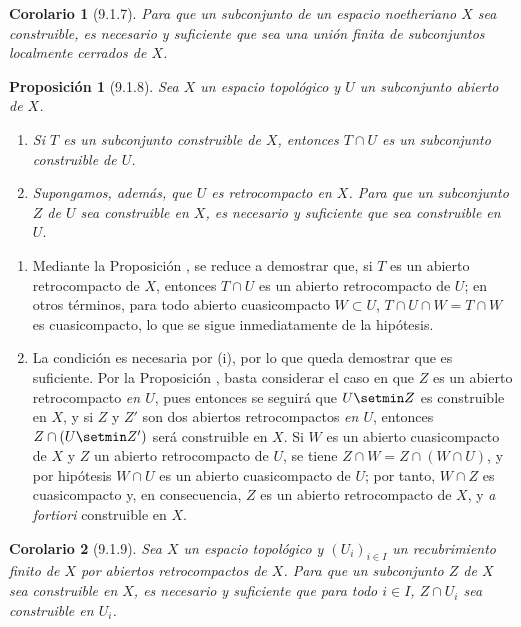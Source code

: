 \documentclass[10pt,oneside,openany]{book}
\theoremstyle{egaenv}\newtheorem*{env}{---}
\theoremstyle{egastatement}
\newtheorem*{proposition}{Proposición}
\newtheorem*{corollary}{Corolario}
\theoremstyle{egadescription}
\begin{document}
\begin{corollary}[9.1.7]
\label{0.9.1.7}
\label{0.9.1.7-fr}
Para que un subconjunto de un espacio noetheriano $X$ sea construible, es necesario y suficiente que sea una unión finita de subconjuntos localmente cerrados de $X$.
\end{corollary}

\begin{proposition}[9.1.8]
\label{0.9.1.8}
\label{0.9.1.8-fr}
Sea $X$ un espacio topológico y $U$ un subconjunto abierto de $X$.
\begin{enumerate}
  \item[{\rm(i)}] Si $T$ es un subconjunto construible de $X$, entonces $T\cap U$ es un subconjunto construible de $U$.
  \item[{\rm(ii)}] Supongamos, además, que $U$ es retrocompacto en $X$. Para que un subconjunto $Z$ de $U$ sea construible en $X$, es necesario y suficiente que sea construible en $U$.
\end{enumerate}
\end{proposition}


\medskip\noindent
\begin{enumerate}
  \item[(i)] Mediante la Proposición , se reduce a demostrar que, si $T$ es un abierto retrocompacto de $X$, entonces $T\cap U$ es un abierto retrocompacto de $U$; en otros términos, para todo abierto cuasicompacto $W\subset U$, $T\cap U\cap W=T\cap W$ es cuasicompacto, lo que se sigue inmediatamente de la hipótesis.
  \item[(ii)] La condición es necesaria por (i), por lo que queda demostrar que es suficiente.
    Por la Proposición , basta considerar el caso en que $Z$ es un abierto retrocompacto \emph{en $U$}, pues entonces se seguirá que $U\setmin Z$ es construible en $X$, y si $Z$ y $Z'$ son dos abiertos retrocompactos \emph{en $U$}, entonces $Z\cap(U\setmin Z')$ será construible en $X$.
    Si $W$ es un abierto cuasicompacto de $X$ y $Z$ un abierto retrocompacto de $U$, se tiene $Z\cap W=Z\cap(W\cap U)$, y por hipótesis $W\cap U$ es un abierto cuasicompacto de $U$; por tanto, $W\cap Z$ es cuasicompacto y, en consecuencia, $Z$ es un abierto retrocompacto de $X$, y \emph{a fortiori} construible en $X$.
\end{enumerate}


\begin{corollary}[9.1.9]
\label{0.9.1.9}
\label{0.9.1.9-fr}
Sea $X$ un espacio topológico y $(U_i)_{i\in I}$ un recubrimiento finito de $X$ por abiertos retrocompactos de $X$.
Para que un subconjunto $Z$ de $X$ sea construible en $X$, es necesario y suficiente que para todo $i\in I$, $Z\cap U_i$ sea construible en $U_i$.
\end{corollary}
\end{document}

